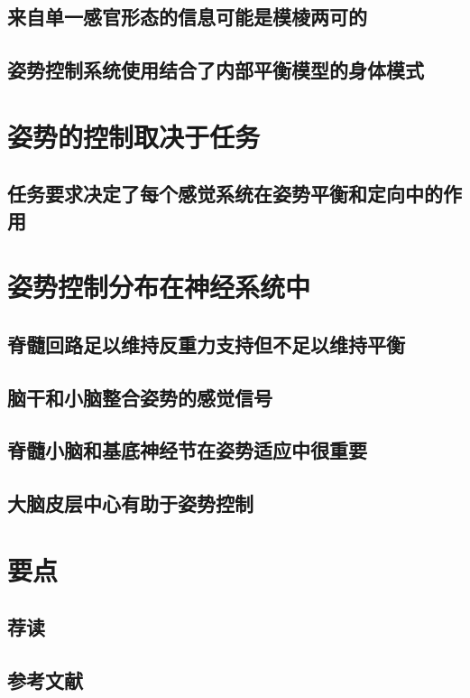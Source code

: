 \subsection{来自单一感官形态的信息可能是模棱两可的}
\subsection{姿势控制系统使用结合了内部平衡模型的身体模式}

\section{姿势的控制取决于任务}
\subsection{任务要求决定了每个感觉系统在姿势平衡和定向中的作用}

\section{姿势控制分布在神经系统中}
\subsection{脊髓回路足以维持反重力支持但不足以维持平衡}
\subsection{脑干和小脑整合姿势的感觉信号}
\subsection{脊髓小脑和基底神经节在姿势适应中很重要}
\subsection{大脑皮层中心有助于姿势控制}

\section{要点}
\subsection{荐读}
\subsection{参考文献}